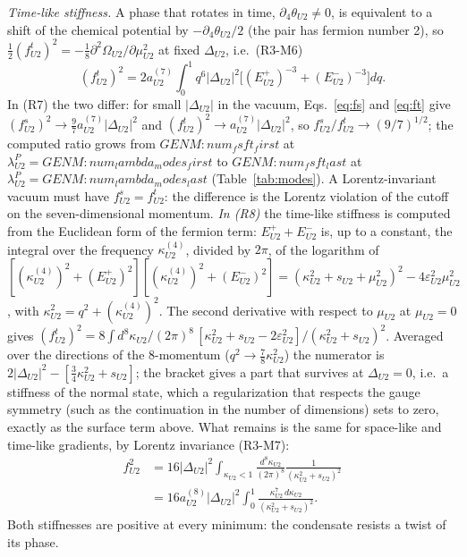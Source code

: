 \emph{Time-like stiffness.} A phase that rotates in time, $\partial_4\theta_{U2}\neq0$, is equivalent to a
shift of the chemical potential by $-\partial_4\theta_{U2}/2$ (the pair has fermion number 2), so
$\tfrac12(f^t_{U2})^2=-\tfrac18\partial^2\Omega_{U2}/\partial\mu^2_{U2}$ at fixed $\Delta_{U2}$, i.e.\
(R3-M6)
\begin{equation}
(f^t_{U2})^2=2a^{(7)}_{U2}\int_0^1q^6|\Delta_{U2}|^2\big[(E^+_{U2})^{-3}+(E^-_{U2})^{-3}\big]dq.
\label{eq:ft}
\end{equation}
In (R7) the two differ: for small $|\Delta_{U2}|$ in the vacuum, Eqs.~\eqref{eq:fs} and \eqref{eq:ft}
give $(f^s_{U2})^2\to\tfrac97a^{(7)}_{U2}|\Delta_{U2}|^2$ and $(f^t_{U2})^2\to a^{(7)}_{U2}|\Delta_{U2}|^2$, so
$f^s_{U2}/f^t_{U2}\to(9/7)^{1/2}$; the computed ratio grows from ${{GENM:num_fsft_first}}$ at
$\lambda^P_{U2}={{GENM:num_lambda_modes_first}}$ to ${{GENM:num_fsft_last}}$ at
$\lambda^P_{U2}={{GENM:num_lambda_modes_last}}$ (Table~\ref{tab:modes}). A Lorentz-invariant vacuum must have
$f^s_{U2}=f^t_{U2}$: the difference is the Lorentz violation of the cutoff on the seven-dimensional
momentum. \emph{In (R8)} the time-like stiffness is computed from the Euclidean form of the fermion
term: $E^+_{U2}+E^-_{U2}$ is, up to a constant, the integral over the frequency $\kappa^{(4)}_{U2}$,
divided by $2\pi$, of the logarithm of
$[(\kappa^{(4)}_{U2})^2+(E^+_{U2})^2][(\kappa^{(4)}_{U2})^2+(E^-_{U2})^2]=(\kappa^2_{U2}+s_{U2}+\mu^2_{U2})^2
-4\varepsilon^2_{U2}\mu^2_{U2}$, with $\kappa^2_{U2}=q^2+(\kappa^{(4)}_{U2})^2$. The second derivative with
respect to $\mu_{U2}$ at $\mu_{U2}=0$ gives
$(f^t_{U2})^2=8\int d^8\kappa_{U2}/(2\pi)^8\,[\kappa^2_{U2}+s_{U2}-2\varepsilon^2_{U2}]/(\kappa^2_{U2}+s_{U2})^2$.
Averaged over the directions of the 8-momentum ($q^2\to\tfrac78\kappa^2_{U2}$) the numerator is
$2|\Delta_{U2}|^2-[\tfrac34\kappa^2_{U2}+s_{U2}]$; the bracket gives a part that survives at
$\Delta_{U2}=0$, i.e.\ a stiffness of the normal state, which a regularization that respects the gauge
symmetry (such as the continuation in the number of dimensions) sets to zero, exactly as the surface
term above. What remains is the same for space-like and time-like gradients, by Lorentz invariance
(R3-M7):
\begin{equation}
\begin{aligned}
f^2_{U2}&=16|\Delta_{U2}|^2\!\int_{\kappa_{U2}<1}\!\frac{d^8\kappa_{U2}}{(2\pi)^8}\frac{1}{(\kappa^2_{U2}+s_{U2})^2}\\
&=16a^{(8)}_{U2}|\Delta_{U2}|^2\int_0^1\frac{\kappa^7_{U2}\,d\kappa_{U2}}{(\kappa^2_{U2}+s_{U2})^2}.
\end{aligned}
\label{eq:fR8}
\end{equation}
Both stiffnesses are positive at every minimum: the condensate resists a twist of its phase.


